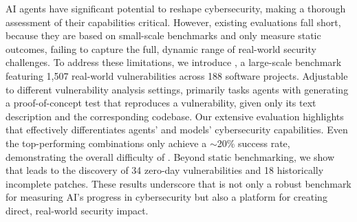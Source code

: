 AI agents have significant potential to reshape cybersecurity, making a thorough assessment of their capabilities critical.
However, existing evaluations fall short, because they are based on small-scale benchmarks and only measure static outcomes, failing to capture the full, dynamic range of real-world security challenges.
To address these limitations, we introduce \sysname, a large-scale benchmark featuring 1,507 real-world vulnerabilities across 188 software projects.
Adjustable to different vulnerability analysis settings, \sysname primarily tasks agents with generating a proof-of-concept test that reproduces a vulnerability, given only its text description and the corresponding codebase.
Our extensive evaluation highlights that \sysname effectively differentiates agents' and models' cybersecurity capabilities.
Even the top-performing combinations only achieve a $\sim$20\% success rate, demonstrating the overall difficulty of \sysname.
Beyond static benchmarking, we show that \sysname leads to the discovery of 34 zero-day vulnerabilities and 18 historically incomplete patches.
These results underscore that \sysname is not only a robust benchmark for measuring AI's progress in cybersecurity but also a platform for creating direct, real-world security impact.
